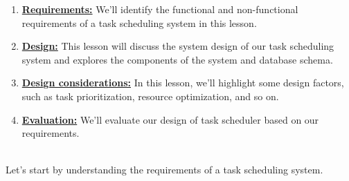 \begin{enumerate}
\item
\protect{}\label{yWRMPvzCpgSgAU0Sb2OHI}
\href{https://www.educative.io/courses/grokking-the-system-design-interview/requirements-of-a-distributed-task-schedulers-design}{\textbf{Requirements:}} We'll identify the functional and non-functional requirements of a task scheduling system in this lesson.
\item
\protect{}\label{_6DgH5CcJfYAYDZxUnRiS}
\href{https://www.educative.io/courses/grokking-the-system-design-interview/design-of-a-distributed-task-scheduler}{\textbf{Design:}} This lesson will discuss the system design of our task scheduling system and explores the components of the system and database schema.
\item
\protect{}\label{MbiY3E9N1JJsTuwiEVg2X}
\href{https://www.educative.io/courses/grokking-the-system-design-interview/design-considerations-of-a-distributed-task-scheduler}{\textbf{Design considerations:}} In this lesson, we'll highlight some design factors, such as task prioritization, resource optimization, and so on.
\item
\protect{}\label{5kbTJmOu8PGApDd7SzzcK}
\href{https://www.educative.io/courses/grokking-the-system-design-interview/evaluation-of-a-distributed-task-schedulers-design}{\textbf{Evaluation:}} We'll evaluate our design of task scheduler based on our requirements.
\end{enumerate}
\\
Let's start by understanding the requirements of a task scheduling system.

